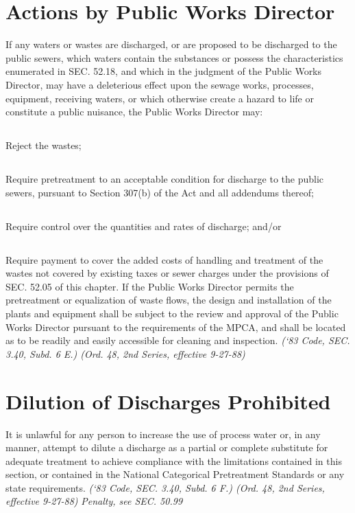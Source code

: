 \documentclass[code.tex]{subfiles}
\begin{document}
\section{Actions by Public Works Director}
If any waters or wastes are discharged, or are proposed to be discharged to the public sewers, which waters contain the substances or possess the characteristics enumerated in SEC. 52.18, and which in the judgment of the Public Works Director, may have a deleterious effect upon the sewage works, processes, equipment, receiving waters, or which otherwise create a hazard to life or constitute a public nuisance, the Public Works Director may:
\subsection{}
Reject the wastes;
\subsection{}
Require pretreatment to an acceptable condition for discharge to the public sewers, pursuant to Section 307(b) of the Act and all addendums thereof;
\subsection{}
Require control over the quantities and rates of discharge; and/or
\subsection{}
Require payment to cover the added costs of handling and treatment of the wastes not covered by existing taxes or sewer charges under the provisions of SEC. 52.05 of this chapter.  If the Public Works Director permits the pretreatment or equalization of waste flows, the design and installation of the plants and equipment shall be subject to the review and approval of the Public Works Director pursuant to the requirements of the MPCA, and shall be located as to be readily and easily accessible for cleaning and inspection.\newline
\emph{(‘83 Code, SEC. 3.40, Subd. 6 E.) (Ord. 48, 2nd Series, effective 9-27-88)}
\section{Dilution of Discharges Prohibited}
It is unlawful for any person to increase the use of process water or, in any manner, attempt to dilute a discharge as a partial or complete substitute for adequate treatment to achieve compliance with the limitations contained in this section, or contained in the National Categorical Pretreatment Standards or any state requirements.\newline
\emph{(‘83 Code, SEC. 3.40, Subd. 6 F.) (Ord. 48, 2nd Series, effective 9-27-88)}\newline
\emph{Penalty, see SEC. 50.99}
\end{document}
